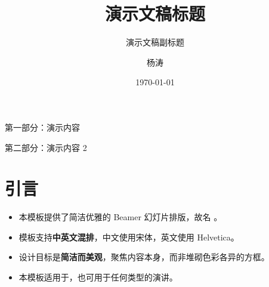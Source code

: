 \documentclass[
11pt,notheorems,hyperref={pdfauthor=whatever},aspectratio=169
]{beamer}
\title[]{演示文稿标题}
\subtitle{演示文稿副标题}
\author[]{杨涛}
\institute{某某大学，\\某某学院}
\date{\today}
\begin{document}
{
\begin{frame}
  \titlepage
\end{frame}
}
\addtocounter{framenumber}{-1}

\begin{frame}{第一部分：演示内容}
    \tableofcontents[part=1]
\end{frame}
\begin{frame}{第二部分：演示内容 2}
    \tableofcontents[part=2]
\end{frame}


\section{引言}
\begin{frame}
\begin{itemize}
    \item 本模板提供了简洁优雅的 Beamer 幻灯片排版，故名 。
    \item 模板支持\alert{\textbf{中英文混排}}，中文使用宋体，英文使用 Helvetica。
    \item 设计目标是\alert{\textbf{简洁而美观}}，聚焦内容本身，而非堆砌色彩各异的方框。
    \item 本模板适用于，也可用于任何类型的演讲。
\end{itemize}
\end{frame}
\end{document}
